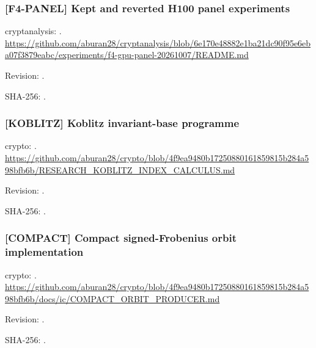 \par\noindent\begin{minipage}{\linewidth}\small
\subsubsection*{[F4-PANEL] Kept and reverted H100 panel experiments}\label{art:F4-PANEL}
cryptanalysis: .
\url{https://github.com/aburan28/cryptanalysis/blob/6e170e48882e1ba21dc90f95e6eba07f3879eabc/experiments/f4-gpu-panel-20261007/README.md}
\par Revision: .
\par SHA-256: .
\end{minipage}\par\medskip

\par\noindent\begin{minipage}{\linewidth}\small
\subsubsection*{[KOBLITZ] Koblitz invariant-base programme}\label{art:KOBLITZ}
crypto: .
\url{https://github.com/aburan28/crypto/blob/4f9ea9480b17250880161859815b284a598bfb6b/RESEARCH_KOBLITZ_INDEX_CALCULUS.md}
\par Revision: .
\par SHA-256: .
\end{minipage}\par\medskip

\par\noindent\begin{minipage}{\linewidth}\small
\subsubsection*{[COMPACT] Compact signed-Frobenius orbit implementation}\label{art:COMPACT}
crypto: .
\url{https://github.com/aburan28/crypto/blob/4f9ea9480b17250880161859815b284a598bfb6b/docs/ic/COMPACT_ORBIT_PRODUCER.md}
\par Revision: .
\par SHA-256: .
\end{minipage}\par\medskip

